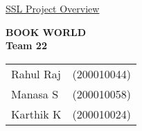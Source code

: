 \documentclass[12pt]{article}
\begin{document}
\begin{center}
{\Huge\underline{SSL Project Overview} }
\vspace{20pt}

 {\Huge\textbf{BOOK WORLD} }
 \\
 \vspace{15pt}
\Large\textbf{Team 22}
\\
\vspace{20pt}
\begin{tabular}{l c}
      Rahul Raj &  (200010044) \\
     Manasa S& (200010058)\\
     Karthik K & (200010024) \\
     
\end{tabular}
\end{center}



\newpage
\end{document}
